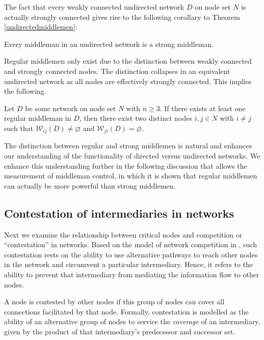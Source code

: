 \medskip\noindent
The fact that every weakly connected undirected network $D$ on node set $N$ is actually strongly connected gives rise to the following corollary to Theorem \ref{undirectedmiddlemen}:

\begin{corollary}
	Every middleman in an undirected network is a strong middleman.
\end{corollary}

\noindent Regular middlemen only exist due to the distinction between weakly connected and strongly connected nodes. The distinction collapses in an equivalent undirected network as all nodes are effectively strongly connected. This implies the following.

\begin{corollary} \label{corundirectedmiddleman}
Let $D$ be some network on node set $N$ with $n \geqslant 3$. If there exists at least one regular middleman in $D$, then there exist two distinct nodes $i,j \in N$ with $i \neq j$ such that $\mathcal W_{ij} (D) \neq \varnothing$ and $\mathcal W_{ji} (D) = \varnothing$.
\end{corollary}

\noindent
The distinction between regular and strong middlemen is natural and enhances our understanding of the functionality of directed versus undirected networks. We enhance this understanding further in the following discussion that allows the measurement of middleman control, in which it is shown that regular middlemen can actually be more powerful than strong middlemen.

\subsection{Contestation of intermediaries in networks}

Next we examine the relationship between critical nodes and competition or ``contestation'' in networks. Based on the model of network competition in \citet{GillesDiamantaris2013}, such contestation rests on the ability to use alternative pathways to reach other nodes in the network and circumvent a particular intermediary. Hence, it refers to the ability to prevent that intermediary from mediating the information flow to other nodes.

 A node is contested by other nodes if this group of nodes can cover all connections facilitated by that node. Formally, contestation is modelled as the ability of an alternative group of nodes to service the \emph{coverage} of an intermediary, given by the product of that intermediary's predecessor and successor set.

